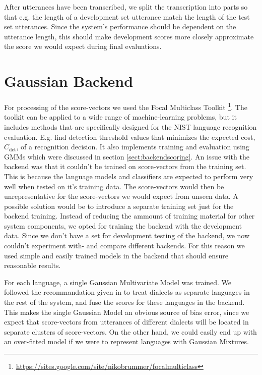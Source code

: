 After utterances have been transcribed, we split the transcription into parts so that e.g. the length of a development set utterance match the length of the test set utterances. Since the system's performance should be dependent on the utterance length, this should make development scores more closely approximate the score we would expect during final evaluations. 


\section{Gaussian Backend}
\label{sect:implgaussback}

For processing of the score-vectors we used the Focal Multiclass Toolkit \footnote{\url{https://sites.google.com/site/nikobrummer/focalmulticlass}}. The toolkit can be applied to a wide range of machine-learning problems, but it includes methods that are specifically designed for the NIST language recognition evaluation.  E.g. find detection threshold values that minimizes the expected cost, $C_{\text{det}}$, of a recognition decision. It also implements training and evaluation using GMMs which were discussed in section \ref{sect:backendscoring}. An issue with the backend was that it couldn't be trained on score-vectors from the training set. This is because the language models and classifiers are expected to perform very well  when tested on it's training data. The score-vectors would then be unrepresentative for the score-vectors we would expect from unseen data. A possible solution would be to introduce a separate training set just for the backend training. Instead of reducing the ammount of training material for other system components, we opted for training the backend with the development data. Since we don't have a set for development testing of the backend, we now couldn't experiment with- and compare different backends. For this reason we used simple and easily trained models in the backend that should ensure reasonable results. 

For each language, a single Gaussian Multivariate Model was trained. We followed the recommandation given in \cite[p. 70]{matejkalre} to treat dialects as separate languages in the rest of the system, and fuse the scores for these languages in the backend. This makes the single Gaussian Model an obvious source of bias error, since we expect that score-vectors from utterances of different dialects will be located in separate clusters of score-vectors. On the other hand, we could easily end up with an over-fitted model if we were to represent languages with Gaussian Mixtures. 

